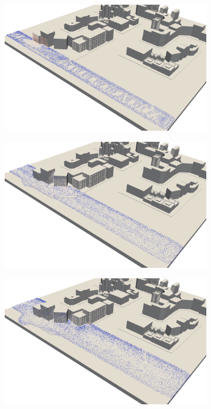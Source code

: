 \begin{figure}[h]
  \begin{subfigure}{.5\textwidth}
    \centering
    \includegraphics[width=\textwidth]{figures/impulses-0.png}
  \end{subfigure}
  \begin{subfigure}{.5\textwidth}
    \centering
    \includegraphics[width=\textwidth]{figures/impulses-1.png}
  \end{subfigure}
  \begin{subfigure}{.5\textwidth}
    \centering
    \includegraphics[width=\textwidth]{figures/impulses-2.png}

\end{subfigure}
\end{figure}
